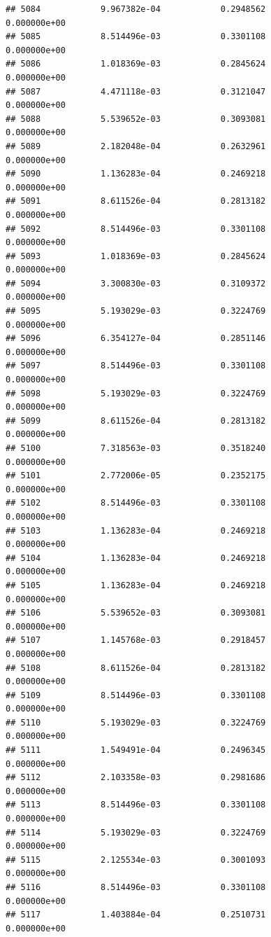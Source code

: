 \documentclass[
]{article}
\begin{document}
\begin{verbatim}
## 5084            9.967382e-04            0.2948562            0.000000e+00
## 5085            8.514496e-03            0.3301108            0.000000e+00
## 5086            1.018369e-03            0.2845624            0.000000e+00
## 5087            4.471118e-03            0.3121047            0.000000e+00
## 5088            5.539652e-03            0.3093081            0.000000e+00
## 5089            2.182048e-04            0.2632961            0.000000e+00
## 5090            1.136283e-04            0.2469218            0.000000e+00
## 5091            8.611526e-04            0.2813182            0.000000e+00
## 5092            8.514496e-03            0.3301108            0.000000e+00
## 5093            1.018369e-03            0.2845624            0.000000e+00
## 5094            3.300830e-03            0.3109372            0.000000e+00
## 5095            5.193029e-03            0.3224769            0.000000e+00
## 5096            6.354127e-04            0.2851146            0.000000e+00
## 5097            8.514496e-03            0.3301108            0.000000e+00
## 5098            5.193029e-03            0.3224769            0.000000e+00
## 5099            8.611526e-04            0.2813182            0.000000e+00
## 5100            7.318563e-03            0.3518240            0.000000e+00
## 5101            2.772006e-05            0.2352175            0.000000e+00
## 5102            8.514496e-03            0.3301108            0.000000e+00
## 5103            1.136283e-04            0.2469218            0.000000e+00
## 5104            1.136283e-04            0.2469218            0.000000e+00
## 5105            1.136283e-04            0.2469218            0.000000e+00
## 5106            5.539652e-03            0.3093081            0.000000e+00
## 5107            1.145768e-03            0.2918457            0.000000e+00
## 5108            8.611526e-04            0.2813182            0.000000e+00
## 5109            8.514496e-03            0.3301108            0.000000e+00
## 5110            5.193029e-03            0.3224769            0.000000e+00
## 5111            1.549491e-04            0.2496345            0.000000e+00
## 5112            2.103358e-03            0.2981686            0.000000e+00
## 5113            8.514496e-03            0.3301108            0.000000e+00
## 5114            5.193029e-03            0.3224769            0.000000e+00
## 5115            2.125534e-03            0.3001093            0.000000e+00
## 5116            8.514496e-03            0.3301108            0.000000e+00
## 5117            1.403884e-04            0.2510731            0.000000e+00

\end{verbatim}
\end{document}
